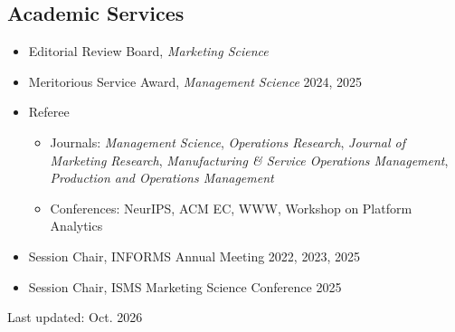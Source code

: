 \documentclass[margin,line]{resume}
\begin{document}
\begin{resume}
\section{\mysidestyle Academic Services}
\begin{itemize}[topsep=-5mm, leftmargin=0mm]
    \item [] Editorial Review Board, \textit{Marketing Science}
    \item [] Meritorious Service Award, \textit{Management Science} \hfill 2024, 2025
    \item [] Referee
\begin{itemize}
    \item [-] {\raggedright Journals: \textit{Management Science}, \textit{Operations Research}, \textit{Journal of Marketing Research}, \textit{Manufacturing \& Service Operations Management}, \textit{Production and Operations Management}\par}
    \item [-] Conferences: NeurIPS, ACM EC, WWW, Workshop on Platform Analytics
\end{itemize}
\item [] Session Chair, INFORMS Annual Meeting \hfill 2022, 2023, 2025
\item [] Session Chair, ISMS Marketing Science Conference \hfill 2025

\end{itemize}

\vspace*{0.5cm}
\hfill
\footnotesize Last updated: Oct. 2026
\end{resume}
\end{document}
